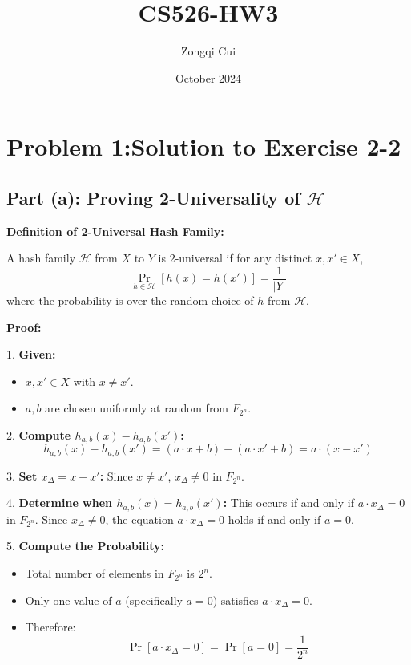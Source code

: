 \documentclass[12pt,letterpaper]{article}
\title{CS526-HW3}
\author{Zongqi Cui}
\date{October 2024}
\begin{document}
\maketitle
\section*{Problem 1:Solution to Exercise 2-2}


\subsection*{Part (a): Proving 2-Universality of \( \mathcal{H} \)}

\textbf{Definition of 2-Universal Hash Family:}

A hash family \( \mathcal{H} \) from \( X \) to \( Y \) is 2-universal if for any distinct \( x, x' \in X \),
\[
\Pr_{h \in \mathcal{H}}[h(x) = h(x')] = \frac{1}{|Y|}
\]
where the probability is over the random choice of \( h \) from \( \mathcal{H} \).

\textbf{Proof:}

1. \textbf{Given:}
   \begin{itemize}
       \item \( x, x' \in X \) with \( x \neq x' \).
       \item \( a, b \) are chosen uniformly at random from \( F_{2^n} \).
   \end{itemize}

2. \textbf{Compute \( h_{a,b}(x) - h_{a,b}(x') \):}
   \[
   h_{a,b}(x) - h_{a,b}(x') = (a \cdot x + b) - (a \cdot x' + b) = a \cdot (x - x')
   \]

3. \textbf{Set \( x_{\Delta} = x - x' \):}
   Since \( x \neq x' \), \( x_{\Delta} \neq 0 \) in \( F_{2^n} \).

4. \textbf{Determine when \( h_{a,b}(x) = h_{a,b}(x') \):}
   This occurs if and only if \( a \cdot x_{\Delta} = 0 \) in \( F_{2^n} \).
   Since \( x_{\Delta} \neq 0 \), the equation \( a \cdot x_{\Delta} = 0 \) holds if and only if \( a = 0 \).

5. \textbf{Compute the Probability:}
   \begin{itemize}
       \item Total number of elements in \( F_{2^n} \) is \( 2^n \).
       \item Only one value of \( a \) (specifically \( a = 0 \)) satisfies \( a \cdot x_{\Delta} = 0 \).
       \item Therefore:
         \[
         \Pr[a \cdot x_{\Delta} = 0] = \Pr[a = 0] = \frac{1}{2^n}
         \]
   \end{itemize}
\end{document}
